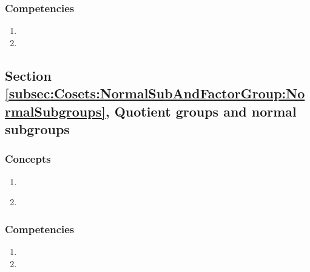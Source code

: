 \subsubsection*{Competencies}
\begin{enumerate}
\item
\item
\end{enumerate}


\subsection*{Section \ref{subsec:Cosets:NormalSubAndFactorGroup:NormalSubgroups}, Quotient groups and normal subgroups}
\subsubsection*{Concepts}
\begin{enumerate}
\item 
\
\
\
\item
\end{enumerate}

\subsubsection*{Competencies}
\begin{enumerate}
\item
\item
\end{enumerate}





